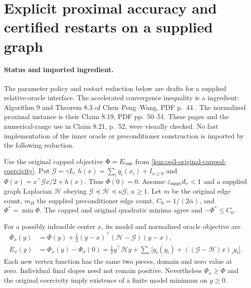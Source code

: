 \section[Explicit proximal accuracy]{Explicit proximal accuracy and certified restarts on a supplied graph}
\label{sec:op3-capped-proximal-budget}

\paragraph{Status and imported ingredient.}
The parameter policy and restart reduction below are \statusproved{}
drafts for a supplied relative-oracle interface. The accelerated convergence
inequality is a \statussource{} ingredient: Algorithm 9 and Theorem 8.3 of
Chen--Peng--Wang, PDF p.\ 44 \citep{chen2021diffusion}. The normalized
proximal instance is their Claim 8.19, PDF pp.\ 50--51. These pages and
the numerical-range use in Claim 8.21, p.\ 52, were visually checked.
No fast implementation of the inner oracle or preconditioner construction
is imported by the following reduction.

Use the original capped objective $\Phi=E_{\rm cap}$ from
\cref{lem:op3-original-capped-coercivity}. Put
$\mathcal G=\gamma L$, $h(x)=\sum_iq_i(x_i)+I_{x\geq0}$ and
$\Phi(x)=x^\top\mathcal Gx/2+h(x)$. Thus $\Phi(0)=0$.
Assume $\varepsilon_{\mathrm{appr}} d_v<1$ and a supplied graph Laplacian $\mathcal H$
obeying $\mathcal G\preceq\mathcal H\preceq\kappa\mathcal G$,
$\kappa\geq1$. Let $m$ be the original edge count, $m_H$ the supplied
preconditioner edge count, $C_0=1/(2\bar\alpha)$, and $\Phi^*=\min\Phi$.
The capped and original quadratic minima agree and $-\Phi^*\leq C_0$.

For a possibly infeasible center $x$, its model and normalized oracle
objective are
\begin{align}
 \Phi_x(y)&=\Phi(y)+\tfrac12(y-x)^\top
              (\mathcal H-\mathcal G)(y-x),\label{eq:op3-capped-prox-model}\\
 E_x(y)&=\Phi_x(y)-\Phi_x(0)
 =\tfrac12y^\top\mathcal Hy+
 \sum_i\bigl[q_i(y_i)+((\mathcal G-\mathcal H)x)_iy_i\bigr].
 \label{eq:op3-capped-prox-normalization}
\end{align}
Each new vertex function has the same two pieces, domain and zero value
at zero. Individual final slopes need not remain positive. Nevertheless
$\Phi_x\geq\Phi$ and the original coercivity imply existence of a
finite model minimum on $y\geq0$.

